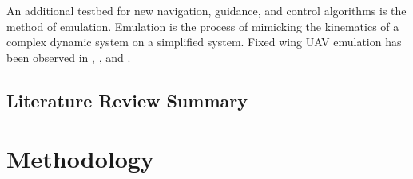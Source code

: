\documentclass[numbered,pdftex]{ohio-etd}
\begin{document}
An additional testbed for new navigation, guidance, and control algorithms is the method of emulation. Emulation is the process of mimicking the kinematics of a complex dynamic system on a simplified system. Fixed wing UAV emulation has been observed in \cite{louali_designing_2014}, \cite{ren_experimental_2007}, and \cite{louali_experimental_2016}.


\section{Literature Review Summary}


\chapter{Methodology}
\end{document}
